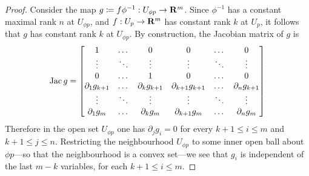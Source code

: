 \begin{proof}
    Consider the map \(g \coloneq f \phi^{-1}: U_{\phi p} \to \mathbf{R}^m\). Since
    \(\phi^{-1}\) has a constant maximal rank \(n\) at \(U_{\phi p}\), and
    \(f: U_p \to \mathbf{R}^m\) has constant rank \(k\) at \(U_p\), it follows that \(g\)
    has constant rank \(k\) at \(U_{\phi p}\). By construction, the Jacobian matrix
    of \(g\) is
    \[
        \operatorname{Jac} g =
        \begin{bmatrix}
            1                  & \dots                  & 0
                               & 0                      & \dots              & 0
            \\
            \vdots             & \ddots                 & \vdots
                               & \vdots                 & \ddots             & \vdots
            \\
            0                  & \dots                  & 1
                               & 0                      & \dots              & 0
            \\
            \partial_1 g_{k+1} & \dots                  & \partial_k g_{k+1}
                               & \partial_{k+1} g_{k+1} & \dots              & \partial_n g_{k+1}
            \\
            \vdots             & \ddots                 & \vdots
                               & \vdots                 & \ddots             & \vdots
            \\
            \partial_1 g_m     & \dots                  & \partial_k g_m
                               & \partial_{k+1} g_m     & \dots              & \partial_n g_m
        \end{bmatrix}
    \]
    Therefore in the open set \(U_{\phi p}\) one has \(\partial_j g_i = 0\) for
    every \(k+1 \leq i \leq m\) and \(k+1 \leq j \leq n\).
    Restricting the neighbourhood \(U_{\phi p}\) to some inner open ball about \(\phi
    p\)---so that the neighbourhood is a convex set---we see that \(g_i\) is
    independent of the last \(m-k\) variables, for each \(k+1 \leq i \leq m\).


\end{proof}
